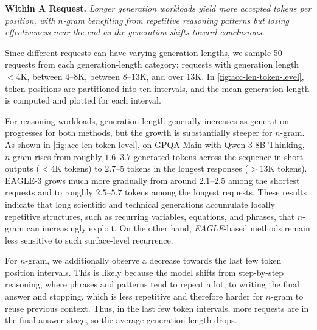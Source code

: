 \documentclass{article}
\newcommand{\jerry}[1]{\textcolor{cyan}{Jerry: #1}}
\begin{document}
\begin{quoting}[leftmargin=1.5em, rightmargin=1.5em, vskip=0pt]
\textbf{Within A Request.}
\emph{Longer generation workloads yield more accepted tokens per position, with $n$-gram benefiting from repetitive reasoning patterns but losing effectiveness near the end as the generation shifts toward conclusions.}

\end{quoting}

Since different requests can have varying generation lengths, we sample 50 requests from each generation-length category: requests with generation length $<$4K, between 4–8K, between 8–13K, and over 13K. 
In \autoref{fig:acc-len-token-level}, token positions are partitioned into ten intervals, and the mean generation length is computed and plotted for each interval.

For reasoning workloads, generation length generally increases as generation progresses for both methods, but the growth is substantially steeper for $n$-gram. As shown in \autoref{fig:acc-len-token-level}, on GPQA-Main with Qwen-3-8B-Thinking, $n$-gram rises from roughly $1.6$--$3.7$ generated tokens across the sequence in short outputs ($<$4K tokens) to $2.7$--$5$ tokens in the longest responses ($>$13K tokens). 
EAGLE-3 grows much more gradually from around $2.1$--$2.5$ among the shortest requests and to roughly $2.5$--$5.7$ tokens among the longest requests. 
These results indicate that long scientific and technical generations accumulate locally repetitive structures, such as recurring variables, equations, and phrases, that $n$-gram can increasingly exploit. On the other hand, \textit{EAGLE}-based methods remain less sensitive to such surface-level recurrence.

For $n$-gram, we additionally observe a decrease towards the last few token position intervals. This is likely because the model shifts from step-by-step reasoning, where phrases and patterns tend to repeat a lot, to writing the final answer and stopping, which is less repetitive and therefore harder for $n$-gram to reuse previous context. Thus, in the last few token intervals, more requests are in the final-answer stage, so the average generation length drops.
\end{document}
